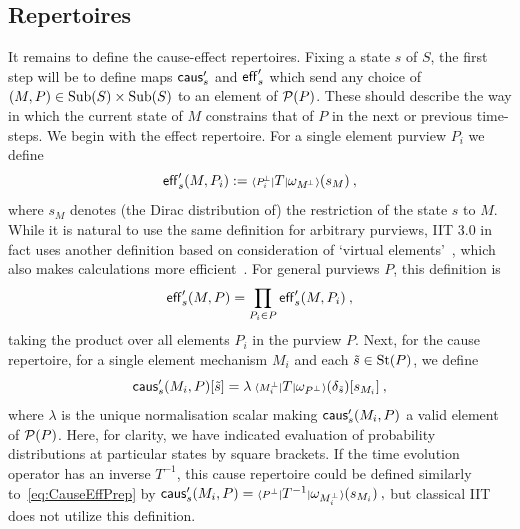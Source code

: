 \subsection{Repertoires}\label{sec:CRep}
It remains to define the cause-effect repertoires. Fixing a state $s$ of $S$, the first step will be to define maps $\mathsf{caus}'_s$ and $\mathsf{eff}'_s$ which send any choice of $(M,P) \in \mathrm{Sub}(S) \times \mathrm{Sub}(S)$ to an element of $\mathcal P(P)$. These should describe the way in which the current state of $M$ constrains that of $P$ in the next or previous time-steps. We begin with the effect repertoire. For a single element purview $P_i$ we define 
\begin{equation}\label{eq:CauseEffPrep}
\mathsf{eff}'_s(M,P_i) := {\scriptstyle \langle P_i^{\!\scriptscriptstyle \bot} |} T {\scriptstyle |} {\omega_{M^{\!\scriptscriptstyle \bot}}}{\scriptstyle \rangle}(s_M) \:,
\end{equation}
where $s_M$ denotes (the Dirac distribution of) the restriction of the state $s$ to $M$.
While it is natural to use the same definition for arbitrary purviews, IIT 3.0 in fact uses another definition based on consideration of `virtual elements'~\cite{mayner2018pyphi,marshall2016integrated,tononi.2015.scholarpedia}, which also makes calculations more efficient~\cite[Supplement S1]{mayner2018pyphi}. For general purviews $P$, this definition is
\begin{equation}\label{eq:Virtual1}
\mathsf{eff}'_s(M,P) = \prod_{P_i\in P} \mathsf{eff}'_s(M,P_i) \:,
\end{equation}
taking the product over all elements $P_i$ in the purview $P$. Next, for the cause repertoire, for a single element mechanism $M_i$
and each $\tilde s \in \text{St}(P)$, we define
\begin{equation} \label{eq:cause-v-simple}
\mathsf{caus}'_s(M_i,P)[\tilde s]
=
\lambda \: {\scriptstyle \langle M_i^\bot |} T {\scriptstyle |} {\omega_{P^{\scriptscriptstyle \bot}}}{\scriptstyle \rangle}(\delta_{\tilde s})[s_{M_i}] \:,
\end{equation}
where $\lambda$ is the unique normalisation scalar making $\mathsf{caus}'_s(M_i,P)$ a valid element of $\mathcal P(P)$. 
Here, for clarity, we have indicated evaluation of probability distributions at particular states by square brackets.
If the time evolution operator has an inverse $T^{-1}$, this cause repertoire could be defined similarly to~\eqref{eq:CauseEffPrep} by
$
\mathsf{caus}'_s(M_i,P)
=  {\scriptstyle \langle P^{\scriptscriptstyle \bot} |} T^{-1} {\scriptstyle |} {\omega_{M_i^{\scriptscriptstyle \bot}}}{\scriptstyle \rangle} (s_{M_i}) \:,
$
but classical IIT does not utilize this definition.

